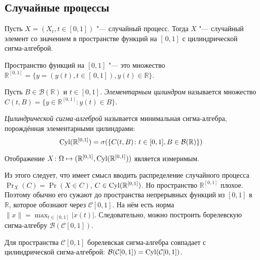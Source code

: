\subsection{Случайные процессы}
Пусть $X = (X_{t}, t \in [0, 1])$ "--- случайный процесс. Тогда $X$ "--- случайный элемент со значением в пространстве функций на $[\,0, 1]$ с цилиндрической сигма-алгеброй.
\begin{definition}
	Пространство функций на $[0, 1]$ "--- это множество $\mathbb{R}^{[0, 1]} = \{y = (y(t), t \in [\,0, 1]), y(t) \in \mathbb{R}\}$.
\end{definition}
\begin{definition}
	Пусть $B \in \mathcal{B}(\mathbb{R})$ и $t \in [0, 1]$. \emph{Элементарным цилиндром} называется множество $C(t, B) = \{y \in \mathbb{R}^{[0, 1]} \colon y(t) \in B\}$.
\end{definition}
\begin{definition}
	\emph{Цилиндрической сигма-алгеброй} называется минимальная сигма-алгебра, порождённая элементарными цилиндрами:
	\begin{equation}
		\operatorname{Cyl}(\mathbb{R}^{[0, 1]}) = \sigma(\{C(t, B) \colon t \in [0, 1], B \in \mathcal{B}(\mathbb{R})\}) 
	\end{equation}
\end{definition}
\begin{statement}
	Отображение $X \colon \Omega \mapsto (\mathbb{R}^{[0, 1]}, \operatorname{Cyl}(\mathbb{R}^{[0, 1]}))$ является измеримым.
\end{statement}
Из этого следует, что имеет смысл вводить распределение случайного процесса $\Pr_{X}(C) = \Pr(X \in C)$, $C \in \operatorname{Cyl}(\mathbb{R}^{[0, 1]})$. Но пространство $\mathbb{R}^{[0, 1]}$ плохое. Поэтому обычно его сужают до пространства непрерывных функций из $[0, 1]$ в $\mathbb{R}$, которое обознают через $\mathcal{C}[0, 1]$. На нём есть норма $\|x\| = \max_{t \in [0, 1]} |x(t)|$. Следовательно, можно построить борелевскую сигма-алгебру $\mathcal{B}(\mathcal{C}[0, 1])$. 
\begin{lemma}
	Для пространства $\mathcal{C}[0, 1]$ борелевская сигма-алгебра совпадает с цилиндрической сигма-алгеброй: $\mathcal{B}(\mathcal{C}[0, 1]) = \operatorname{Cyl}(\mathcal{C}[0, 1])$.
\end{lemma}  
